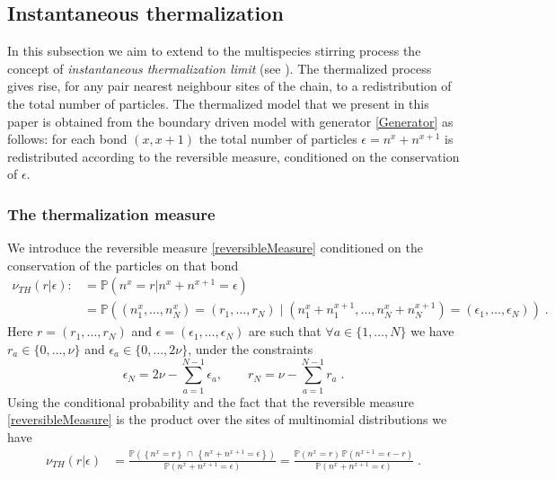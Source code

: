 \documentclass[10pt]{article}
\numberwithin{equation}{section}
\numberwithin{equation}{subsection}
\newcommand{\dt}{\;.}
\begin{document}
\subsection{Instantaneous thermalization}\label{Subsection-Thermalized}
In this subsection we aim to extend to the multispecies stirring process the concept of \textit{instantaneous thermalization limit} (see \cite{carinci2013duality,KMP}). The thermalized process gives rise, for any pair nearest neighbour sites of the chain, to a redistribution of the total number of particles. The thermalized model that we present in this paper is obtained from the boundary driven model with generator \eqref{Generator} as follows: for each bond $(x,x+1)$ the total number of particles $\epsilon=n^{x}+n^{x+1}$ is redistributed according to the reversible measure, conditioned on the conservation of $\epsilon$. 
\subsubsection{The thermalization measure}
We introduce the reversible measure \eqref{reversibleMeasure} conditioned on the conservation of the particles on that bond
\begin{align}
	\nu_{TH}(r|\epsilon):&=\mathbb{P}\left(n^{x}=r|n^{x}+n^{x+1}=\epsilon\right)\nonumber
	\\&
	=\mathbb{P}\left((n_{1}^{x},\ldots,n_{N}^{x})=
	(r_{1},\ldots,r_{N})\;|\;(n_{1}^{x}+n_{1}^{x+1},\ldots,n_{N}^{x}+n_{N}^{x+1})=(\epsilon_{1},\ldots,\epsilon_{N})\right)\dt
\end{align}
Here $r=(r_{1},\ldots,r_{N})$ and  $\epsilon=(\epsilon_{1},\ldots,\epsilon_{N})$ are such that $\forall a\in\{1,\ldots,N\}$ we have $r_{a}\in \{0,\ldots,\nu\}$ and $\epsilon_{a}\in \{0,\ldots,2\nu\}$, under the constraints 
\begin{equation}
	\epsilon_{N}=2\nu-\sum_{a=1}^{N-1}\epsilon_{a},\qquad r_{N}=\nu-\sum_{a=1}^{N-1}r_{a}\dt
\end{equation}
 Using the conditional probability and the fact that the reversible measure \eqref{reversibleMeasure} is the product over the sites of multinomial distributions we have
\begin{equation}
	\begin{split}
\nu_{TH}(r|\epsilon)&=\frac{\mathbb{P}\left(\left\{n^{x}=r\right\}\,\cap\,\left\{n^{x}+n^{x+1}=\epsilon\right\}\right)}{\mathbb{P}\left(n^{x}+n^{x+1}=\epsilon\right)}=\frac{\mathbb{P}\left(n^{x}=r\right)\,\mathbb{P}\left(n^{x+1}=\epsilon-r\right)}{\mathbb{P}\left(n^{x}+n^{x+1}=\epsilon\right)}\dt
	\end{split}
\end{equation}
\end{document}
